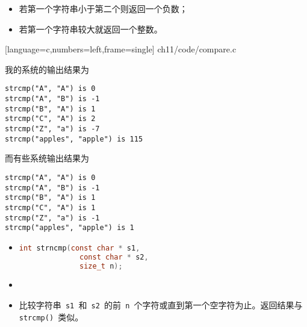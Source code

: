 \begin{frame}[fragile] 
  \begin{itemize}
  \item
    若第一个字符串小于第二个则返回一个负数；
  \item
    若第一个字符串较大就返回一个整数。
  \end{itemize}
\end{frame}

\begin{frame}

[language=c,numbers=left,frame=single]
{ch11/code/compare.c}
\end{frame}


\begin{frame}[fragile]
我的系统的输出结果为
\begin{lstlisting}[backgroundcolor=\color{red!20}]  
strcmp("A", "A") is 0
strcmp("A", "B") is -1
strcmp("B", "A") is 1
strcmp("C", "A") is 2
strcmp("Z", "a") is -7
strcmp("apples", "apple") is 115
\end{lstlisting}
\end{frame}


\begin{frame}[fragile]
而有些系统输出结果为
\begin{lstlisting}[backgroundcolor=\color{red!20}]  
strcmp("A", "A") is 0
strcmp("A", "B") is -1
strcmp("B", "A") is 1
strcmp("C", "A") is 1
strcmp("Z", "a") is -1
strcmp("apples", "apple") is 1
\end{lstlisting}
\end{frame}

\begin{frame}[fragile]
\begin{itemize}
\item {}
\begin{lstlisting}[language=c,backgroundcolor=\color{red!20}]
  int strncmp(const char * s1, 
              const char * s2,
              size_t n);
\end{lstlisting}
\item {}
\item[]
  比较字符串\lstinline| s1 |和\lstinline| s2 |的前\lstinline| n |个字符或直到第一个空字符为止。返回结果与\lstinline| strcmp() |类似。  
\end{itemize}    
\end{frame}


